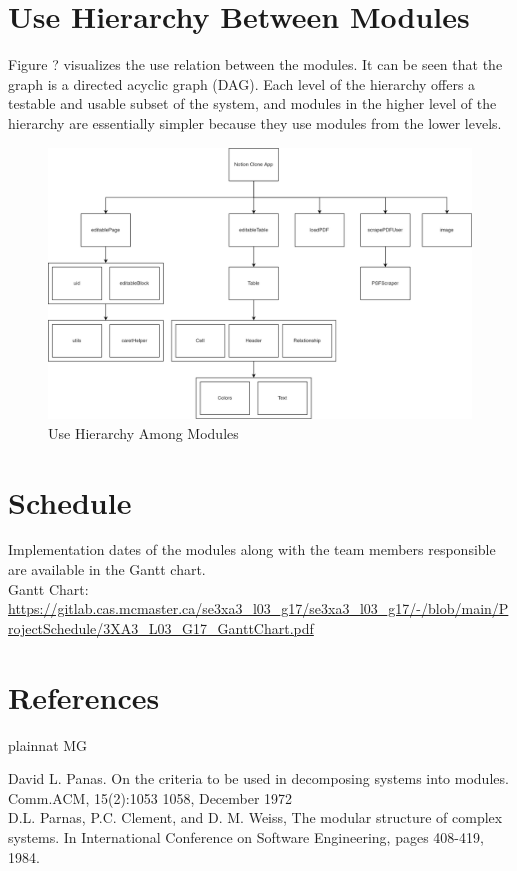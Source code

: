 \documentclass[12pt, titlepage]{article}
\begin{document}
\section{Use Hierarchy Between Modules}
Figure ? visualizes the use relation between the modules. It can be seen that the graph is a directed acyclic graph (DAG). Each level of the hierarchy offers a testable and usable subset of the system, and modules in the higher level of the hierarchy are essentially simpler because they use modules from the lower levels. 

\begin{figure}[htbp]
\centering
\includegraphics[width=\textwidth]{MG_Hierarchy.png}
\caption{Use Hierarchy Among Modules}
\label{FigUH}
\end{figure}

\section{Schedule}

Implementation dates of the modules along with the team members responsible are available in the Gantt chart.\\

Gantt Chart: \url{https://gitlab.cas.mcmaster.ca/se3xa3_l03_g17/se3xa3_l03_g17/-/blob/main/ProjectSchedule/3XA3_L03_G17_GanttChart.pdf}

\section{References}

 {plainnat}
 {MG}

David L. Panas. On the criteria to be used in decomposing systems into modules. Comm.ACM, 15(2):1053 1058, December 1972\\

D.L. Parnas, P.C. Clement, and D. M. Weiss, The modular structure of complex systems. In International Conference on Software Engineering, pages 408-419, 1984.
\end{document}
